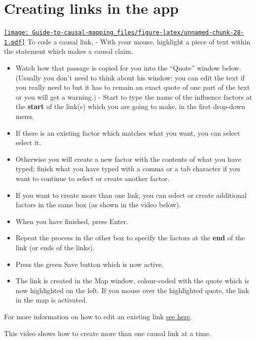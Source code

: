 \documentclass[
]{book}
\providecommand{\tightlist}{%
  \setlength{\itemsep}{0pt}\setlength{\parskip}{0pt}}
\begin{document}
\hypertarget{creating-links-in-the-app}{%
\section{Creating links in the app}\label{creating-links-in-the-app}}

\href{https://player.vimeo.com/video/604099226}{\texttt{[image: Guide-to-causal-mapping\_files/figure-latex/unnamed-chunk-28-1.pdf]}}
To code a causal link, - With your mouse, highlight a piece of text within the statement which makes a causal claim.

\begin{itemize}
\tightlist
\item
  Watch how that passage is copied for you into the ``Quote'' window below. (Usually you don't need to think about his window: you can edit the text if you really need to but it has to remain an exact quote of one part of the text or you will get a warning.) - Start to type the name of the influence factors at the \textbf{start} of the link(s) which you are going to make, in the first drop-down menu.
\item
  If there is an existing factor which matches what you want, you can select select it.
\item
  Otherwise you will create a new factor with the contents of what you have typed; finish what you have typed with a comma or a tab character if you want to continue to select or create another factor.
\item
  If you want to create more than one link, you can select or create additional factors in the same box (as shown in the video below).
\item
  When you have finished, press Enter.
\item
  Repeat the process in the other box to specify the factors at the \textbf{end} of the link (or ends of the links).
\item
  Press the green Save button which is now active.
\item
  The link is created in the Map window, colour-coded with the quote which is now highlighted on the left. If you mouse over the highlighted quote, the link in the map is activated.
\end{itemize}

For more information on how to edit an existing link \protect\hyperlink{xedit-factor-and-links}{see here}.

This video shows how to create more than one causal link at a time.
\end{document}
